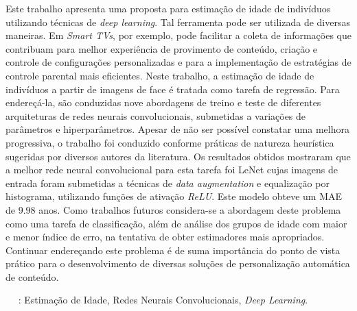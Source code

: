 
  Este trabalho apresenta uma proposta para estimação de idade de indivíduos utilizando técnicas de \emph{deep learning}. Tal ferramenta pode ser utilizada de diversas maneiras. Em \emph{Smart TVs}, por exemplo, pode facilitar a coleta de informações que contribuam para melhor experiência de provimento de conteúdo, criação e controle de configurações personalizadas e para a implementação de estratégias de controle parental mais eficientes. Neste trabalho, a estimação de idade de indivíduos a partir de imagens de face é tratada como tarefa de regressão. Para endereçá-la, são conduzidas nove abordagens de treino e teste de diferentes arquiteturas de redes neurais convolucionais, submetidas a variações de parâmetros e hiperparâmetros. Apesar de não ser possível constatar uma melhora progressiva, o trabalho foi conduzido conforme práticas de natureza heurística sugeridas por diversos autores da literatura. Os resultados obtidos mostraram que a melhor rede neural convolucional para esta tarefa foi LeNet cujas imagens de entrada foram submetidas a técnicas de \emph{data augmentation} e equalização por histograma, utilizando funções de ativação \emph{ReLU}. Este modelo obteve um MAE de $9.98$ anos. Como trabalhos futuros considera-se a abordagem deste problema como uma tarefa de classificação, além de análise dos grupos de idade com maior e menor índice de erro, na tentativa de obter estimadores mais apropriados. Continuar endereçando este problema é de suma importância do ponto de vista prático para o desenvolvimento de diversas soluções de personalização automática de conteúdo.


  \ \ \newline
  : Estimação de Idade, Redes Neurais Convolucionais, \emph{Deep Learning}.
